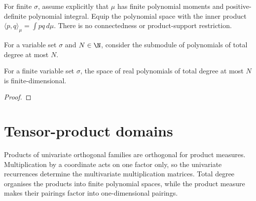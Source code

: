 \begin{supporting}
\begin{definition}
\label{def:multivariate-degree-spaces}
\leanok
For finite $\sigma$, assume explicitly that $\mu$ has finite polynomial moments
and positive-definite polynomial integral. Equip the polynomial space with the inner product $\langle p,q\rangle_\mu=\int pq\,d\mu$. There is no connectedness or product-support restriction.
\end{definition}
\end{supporting}


\begin{supporting}
\begin{definition}
\label{def:mathlib-total-degree}
\mathlibok
For a variable set $\sigma$ and $N\in\N$, consider the submodule of polynomials
of total degree at most $N$.
\end{definition}

\begin{theorem}
\label{thm:mathlib-total-degree-finite}
\mathlibok
For a finite variable set $\sigma$, the space of real polynomials of total
degree at most $N$ is finite-dimensional.
\end{theorem}
\begin{proof}
\mathlibok
\end{proof}

\end{supporting}

\section{Tensor-product domains}\label{sec:tensor}

Products of univariate orthogonal families are orthogonal for product measures.
Multiplication by a coordinate acts on one factor only, so the univariate
recurrences determine the multivariate multiplication matrices. Total degree
organises the products into finite polynomial spaces, while the product
measure makes their pairings factor into one-dimensional pairings.

